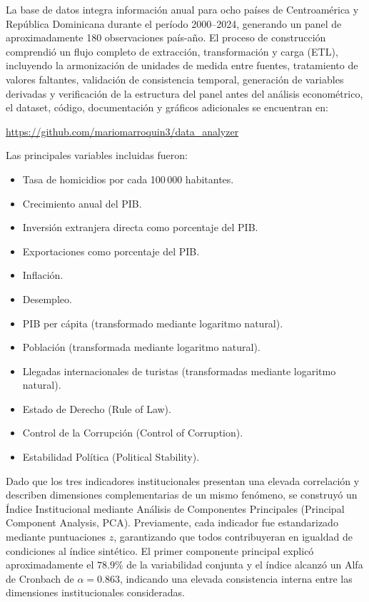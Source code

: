 \documentclass[11pt,a4paper]{article}
\begin{document}
La base de datos integra información anual para ocho países de Centroamérica y República Dominicana durante el período 2000--2024, generando un panel de aproximadamente 180 observaciones país-año. El proceso de construcción comprendió un flujo completo de extracción, transformación y carga (ETL), incluyendo la armonización de unidades de medida entre fuentes, tratamiento de valores faltantes, validación de consistencia temporal, generación de variables derivadas y verificación de la estructura del panel antes del análisis econométrico, el dataset, código, documentación y gráficos adicionales se encuentran en:
\begin{center}
\url{https://github.com/mariomarroquin3/data_analyzer}
\end{center}

Las principales variables incluidas fueron:

\begin{itemize}
\item Tasa de homicidios por cada 100\,000 habitantes.
\item Crecimiento anual del PIB.
\item Inversión extranjera directa como porcentaje del PIB.
\item Exportaciones como porcentaje del PIB.
\item Inflación.
\item Desempleo.
\item PIB per cápita (transformado mediante logaritmo natural).
\item Población (transformada mediante logaritmo natural).
\item Llegadas internacionales de turistas (transformadas mediante logaritmo natural).
\item Estado de Derecho (Rule of Law).
\item Control de la Corrupción (Control of Corruption).
\item Estabilidad Política (Political Stability).
\end{itemize}

Dado que los tres indicadores institucionales presentan una elevada correlación y describen dimensiones complementarias de un mismo fenómeno, se construyó un Índice Institucional mediante Análisis de Componentes Principales (Principal Component Analysis, PCA). Previamente, cada indicador fue estandarizado mediante puntuaciones $z$, garantizando que todos contribuyeran en igualdad de condiciones al índice sintético. El primer componente principal explicó aproximadamente el $78.9\%$ de la variabilidad conjunta y el índice alcanzó un Alfa de Cronbach de $\alpha=0.863$, indicando una elevada consistencia interna entre las dimensiones institucionales consideradas.
\end{document}
